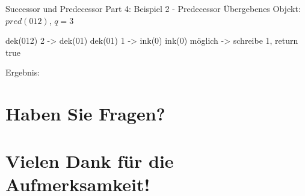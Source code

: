 \documentclass[aspectratio=169]{beamer}
\begin{document}
	\begin{frame}{Successor und Predecessor \newline Part 4: Beispiel 2 - Predecessor}
    Übergebenes Objekt: $pred(012)$, $q=3$ \newline
    
    dek(012) 2 -> dek(01)\newline
    dek(01)  1 -> ink(0) \newline
    ink(0) möglich -> schreibe 1, return true \newline

    Ergebnis: 
    \end{frame}


\section*{Haben Sie Fragen?}
\section*{Vielen Dank für die Aufmerksamkeit!}
  
\end{document}

